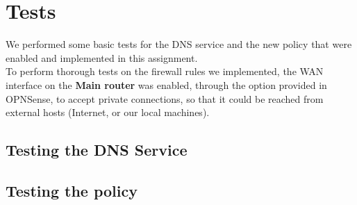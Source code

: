 \section{Tests}
We performed some basic tests for the DNS service and the new policy that were enabled and implemented in this assignment.\\
To perform thorough tests on the firewall rules we implemented, the WAN interface on the \textbf{Main router} was enabled, through the option provided in OPNSense, to accept private connections, so that it could be reached from external hosts (Internet, or our local machines).\\

\subsection{Testing the DNS Service}
\subsection{Testing the policy}
